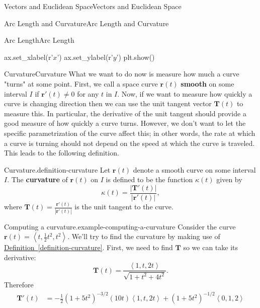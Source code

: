 \documentclass[10pt,]{book}
\newcommand{\terminology}[1]{\textbf{#1}}
\numberwithin{equation}{section}
\newcommand{\vv}[1]{\mathbf{#1}}
\newcommand{\dotprod}[1]{\left\langle #1 \right\rangle}
\begin{document}
\begin{chapterptx}{Vectors and Euclidean Space}{}{Vectors and Euclidean Space}{}{}
\begin{sectionptx}{Arc Length and Curvature}{}{Arc Length and Curvature}{}{}
\begin{subsectionptx}{Arc Length}{}{Arc Length}{}{}
\begin{sageinput}
ax.set_xlabel(r'$x$')
ax.set_ylabel(r'$y$')
plt.show()
\end{sageinput}
\end{subsectionptx}
%
%
\typeout{************************************************}
\typeout{************************************************}
%
\begin{subsectionptx}{Curvature}{}{Curvature}{}{}\label{subsection-curvature}
\hypertarget{p-1068}{}%
What we want to do now is measure how much a curve "turns" at some point. First, we call a space curve \(\vv{r}(t)\) \terminology{smooth} on some interval \(I\) if \(\vv{r}'(t)\neq0\) for any \(t\) in \(I\). Now, if we want to measure how quickly a curve is changing direction then we can use the unit tangent vector \(\vv{T}(t)\) to measure this. In particular, the derivative of the unit tangent should provide a good measure of how quickly a curve turns. However, we don't want to let the specific parametrization of the curve affect this; in other words, the rate at which a curve is turning should not depend on the speed at which the curve is traveled. This leads to the following definition.%
\begin{definition}{Curvature.}{definition-curvature}%
\hypertarget{p-1069}{}%
Let \(\vv{r}(t)\) denote a smooth curve on some interval \(I\). The \terminology{curvature} of \(\vv{r}(t)\) on \(I\) is defined to be the function \(\kappa(t)\) given by%
%
\begin{equation*}
\kappa(t) = \frac{|\vv{T}'(t)|}{|\vv{r}'(t)|},
\end{equation*}
\hypertarget{p-1070}{}%
where \(\vv{T}(t) = \frac{\vv{r}'(t)}{|\vv{r}'(t)|}\) is the unit tangent to the curve.%
\end{definition}
\begin{example}{Computing a curvature.}{example-computing-a-curvature}%
\hypertarget{p-1071}{}%
Consider the curve \(\vv{r}(t) = \dotprod{t,\frac{1}{2}t^{2},t^{2}}.\) We'll try to find the curvature by making use of \hyperref[definition-curvature]{Definition~\ref{definition-curvature}}. First, we need to find \(\vv{T}\) so we can take its derivative:%
%
\begin{equation*}
\vv{T}(t) = \frac{\dotprod{1,t,2t}}{\sqrt{1+t^{2}+4t^{2}}}.
\end{equation*}
\hypertarget{p-1072}{}%
Therefore%
%
\begin{align*}
\vv{T}'(t) & = -\frac{1}{2}(1+5t^{2})^{-3/2}(10t)\dotprod{1,t,2t} + (1+5t^{2})^{-1/2}\dotprod{0,1,2} \\

\end{align*}
\end{example}
\end{subsectionptx}
\end{sectionptx}
\end{chapterptx}
\end{document}
